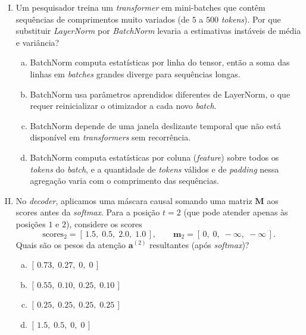 \documentclass{dlproblemset}
\begin{document}
\begin{enumerate}[I)]
\item Um pesquisador treina um \textit{transformer} em mini-batches que
      contêm sequências de comprimentos muito variados (de $5$ a $500$
      \textit{tokens}). Por que substituir \textit{LayerNorm} por
      \textit{BatchNorm} levaria a estimativas instáveis de média e variância?

\begin{enumerate}[a)]
    \item BatchNorm computa estatísticas por linha do tensor, então a soma das
          linhas em \textit{batches} grandes diverge para sequências longas.
    \item BatchNorm usa parâmetros aprendidos diferentes de LayerNorm,
          o que requer reinicializar o otimizador a cada novo \textit{batch}.
    \item BatchNorm depende de uma janela deslizante temporal que não está
          disponível em \textit{transformers} sem recorrência.
    \item BatchNorm computa estatísticas por coluna (\textit{feature}) sobre
          todos os \textit{tokens} do \textit{batch}, e a quantidade de
          \textit{tokens} válidos e de \textit{padding} nessa agregação varia
          com o comprimento das sequências.
\end{enumerate}

\item No \textit{decoder}, aplicamos uma máscara causal somando uma matriz
      $\mathbf{M}$ aos scores antes da \textit{softmax}. Para a posição $t = 2$
      (que pode atender apenas às posições $1$ e $2$), considere os scores
      \[
        \mathrm{scores}_2 = [\,1.5,\; 0.5,\; 2.0,\; 1.0\,], \qquad
        \mathbf{m}_2 = [\,0,\; 0,\; -\infty,\; -\infty\,].
      \]
      Quais são os pesos da atenção $\mathbf{a}^{(2)}$ resultantes (após \textit{softmax})?

\begin{enumerate}[a)]
    \item $[\,0.73,\; 0.27,\; 0,\; 0\,]$
    \item $[\,0.55,\; 0.10,\; 0.25,\; 0.10\,]$
    \item $[\,0.25,\; 0.25,\; 0.25,\; 0.25\,]$
    \item $[\,1.5,\; 0.5,\; 0,\; 0\,]$
\end{enumerate}


\end{enumerate}
\end{document}
